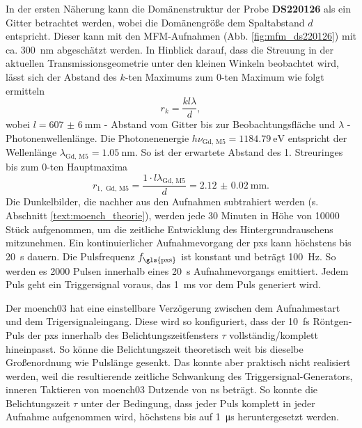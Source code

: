 \noindent
In der ersten Näherung kann die Domänenstruktur der Probe \textbf{DS220126} als ein Gitter betrachtet werden, wobei die Domänengröße dem Spaltabstand $d$ entspricht. Dieser kann mit den MFM-Aufnahmen (Abb. \ref{fig:mfm_ds220126}) mit ca. \SI{300}{\nano\meter} abgeschätzt werden. In Hinblick darauf, dass die Streuung in der aktuellen Transmissionsgeometrie unter den kleinen Winkeln beobachtet wird, lässt sich der Abstand des $k$-ten Maximums zum $0$-ten Maximum wie folgt ermitteln
\begin{equation}
     r_{k} = \frac{kl\lambda}{d},
 \end{equation}
 wobei $l = \SI{607(6)}{\milli\meter}$ - Abstand vom Gitter bis zur Beobachtungsfläche und $\lambda$ - Photonenwellenlänge. Die Photonenenergie $h\nu_{\text{Gd, M5}} = \SI{1184,79}{\eV}$ entspricht der Wellenlänge $\lambda_{\text{Gd, M5}} = \SI{1,05}{\nano\meter}$. So ist der erwartete Abstand des 1. Streuringes bis zum $0$-ten Hauptmaxima 
 \begin{equation}
     r_{1, \text{ Gd, M5}} = \frac{1 \cdot l\lambda_{\text{Gd, M5}}}{d} = \SI{2.12(2)}{\milli\meter}.
     \label{eq:theo_r1}
\end{equation}
\noindent
Die Dunkelbilder, die nachher aus den Aufnahmen subtrahiert werden (s. Abschnitt \ref{text:moench_theorie}), werden jede 30 Minuten in Höhe von \num{10000} Stück aufgenommen, um die zeitliche Entwicklung des Hintergrundrauschens mitzunehmen. Ein kontinuierlicher Aufnahmevorgang der \gls{pxs} kann höchstens bis \SI{20}{\second} dauern. Die Pulsfrequenz $f_\text{\gls{pxs}}$ ist konstant und beträgt \SI{100}{\hertz}. So werden es \num{2000} Pulsen innerhalb eines \SI{20}{\second} Aufnahmevorgangs emittiert. Jedem Puls geht ein Triggersignal voraus, das \SI{1}{\milli\second} vor dem Puls generiert wird.

\noindent
Der \gls{moench03} hat eine einstellbare Verzögerung zwischen dem Aufnahmestart und dem Trigersignaleingang. Diese wird so konfiguriert, dass der \SI{10}{\femto\second} Röntgen-Puls der \gls{pxs} innerhalb des Belichtungszeitfensters $\tau$ vollständig/komplett hineinpasst. So könne die Belichtungszeit theoretisch weit bis dieselbe Großenordnung wie Pulslänge gesenkt. Das konnte aber praktisch nicht realisiert werden, weil die resultierende zeitliche Schwankung des Triggersignal-Generators, inneren Taktieren von \gls{moench03} Dutzende von \si{\nano\second} beträgt. So konnte die Belichtungszeit $\tau$ unter der Bedingung, dass jeder Puls komplett in jeder Aufnahme aufgenommen wird, höchstens bis auf \SI{1}{\micro\second} heruntergesetzt werden.

